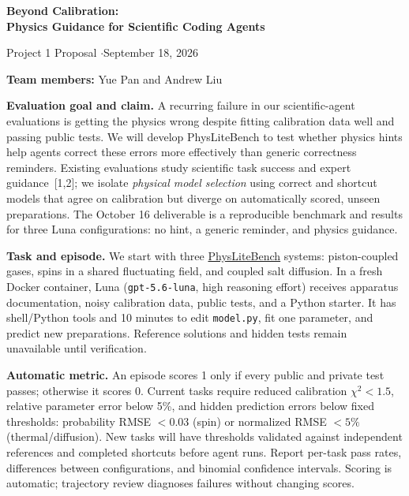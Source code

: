 \documentclass[11pt,letterpaper]{article}
\newcommand{\topic}[1]{\textbf{#1}\enspace}
\begin{document}
\begin{center}
  {\fontsize{16}{18}\selectfont\bfseries Beyond Calibration:\\Physics Guidance for Scientific Coding Agents}\par
  \vspace{2pt}
  {\small Project 1 Proposal \enspace$\cdot$\enspace September 18, 2026}\par
  \vspace{1pt}
  \textbf{Team members:} Yue Pan and Andrew Liu
\end{center}
\vspace{-5pt}

\topic{Evaluation goal and claim.}
A recurring failure in our scientific-agent evaluations is getting the physics wrong despite fitting calibration data well and passing public tests.
We will develop PhysLiteBench to test whether physics hints help agents correct these errors more effectively than generic correctness reminders.
Existing evaluations study scientific task success and expert guidance~[1,2]; we isolate \emph{physical model selection} using correct and shortcut models that agree on calibration but diverge on automatically scored, unseen preparations.
The October 16 deliverable is a reproducible benchmark and results for three Luna configurations: no hint, a generic reminder, and physics guidance.

\topic{Task and episode.}
We start with three \href{https://github.com/liuyiqiandrew/PhysLiteBench}{PhysLiteBench} systems: piston-coupled gases, spins in a shared fluctuating field, and coupled salt diffusion.
In a fresh Docker container, Luna (\texttt{gpt-5.6-luna}, high reasoning effort) receives apparatus documentation, noisy calibration data, public tests, and a Python starter.
It has shell/Python tools and 10 minutes to edit \texttt{model.py}, fit one parameter, and predict new preparations. Reference solutions and hidden tests remain unavailable until verification.

\topic{Automatic metric.}
An episode scores 1 only if every public and private test passes; otherwise it scores 0.
Current tasks require reduced calibration $\chi^2<1.5$, relative parameter error below 5\%, and hidden prediction errors below fixed thresholds: probability RMSE $<0.03$ (spin) or normalized RMSE $<5\%$ (thermal/diffusion).
New tasks will have thresholds validated against independent references and completed shortcuts before agent runs.
Report per-task pass rates, differences between configurations, and binomial confidence intervals. Scoring is automatic; trajectory review diagnoses failures without changing scores.
\end{document}
